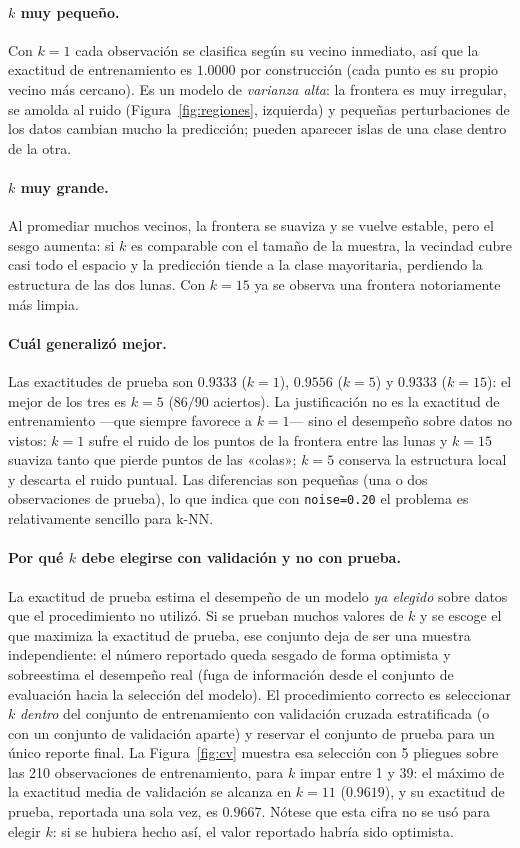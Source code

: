 \documentclass[11pt,a4paper]{article}
\begin{document}
\paragraph{$k$ muy pequeño.} Con $k=1$ cada observación se clasifica según su
vecino inmediato, así que la exactitud de entrenamiento es $1.0000$ por
construcción (cada punto es su propio vecino más cercano). Es un modelo de
\emph{varianza alta}: la frontera es muy irregular, se amolda al ruido
(Figura~\ref{fig:regiones}, izquierda) y pequeñas perturbaciones de los datos
cambian mucho la predicción; pueden aparecer islas de una clase dentro de la otra.

\paragraph{$k$ muy grande.} Al promediar muchos vecinos, la frontera se suaviza y
se vuelve estable, pero el sesgo aumenta: si $k$ es comparable con el tamaño de la
muestra, la vecindad cubre casi todo el espacio y la predicción tiende a la clase
mayoritaria, perdiendo la estructura de las dos lunas. Con $k=15$ ya se observa
una frontera notoriamente más limpia.

\paragraph{Cuál generalizó mejor.} Las exactitudes de prueba son $0.9333$ ($k=1$),
$0.9556$ ($k=5$) y $0.9333$ ($k=15$): el mejor de los tres es $k=5$
($86/90$ aciertos). La justificación no es la exactitud de entrenamiento —que
siempre favorece a $k=1$— sino el desempeño sobre datos no vistos: $k=1$ sufre el
ruido de los puntos de la frontera entre las lunas y $k=15$ suaviza tanto que
pierde puntos de las «colas»; $k=5$ conserva la estructura local y descarta el
ruido puntual. Las diferencias son pequeñas (una o dos observaciones de prueba),
lo que indica que con \texttt{noise=0.20} el problema es relativamente sencillo
para k-NN.

\paragraph{Por qué $k$ debe elegirse con validación y no con prueba.} La exactitud
de prueba estima el desempeño de un modelo \emph{ya elegido} sobre datos que el
procedimiento no utilizó. Si se prueban muchos valores de $k$ y se escoge el que
maximiza la exactitud de prueba, ese conjunto deja de ser una muestra
independiente: el número reportado queda sesgado de forma optimista y sobreestima
el desempeño real (fuga de información desde el conjunto de evaluación hacia la
selección del modelo). El procedimiento correcto es seleccionar $k$ \emph{dentro}
del conjunto de entrenamiento con validación cruzada estratificada (o con un
conjunto de validación aparte) y reservar el conjunto de prueba para un único
reporte final. La Figura~\ref{fig:cv} muestra esa selección con 5 pliegues sobre
las 210 observaciones de entrenamiento, para $k$ impar entre 1 y 39: el máximo de
la exactitud media de validación se alcanza en $k=11$ ($0.9619$), y su exactitud
de prueba, reportada una sola vez, es $0.9667$. Nótese que esta cifra no se usó
para elegir $k$: si se hubiera hecho así, el valor reportado habría sido
optimista.
\end{document}
